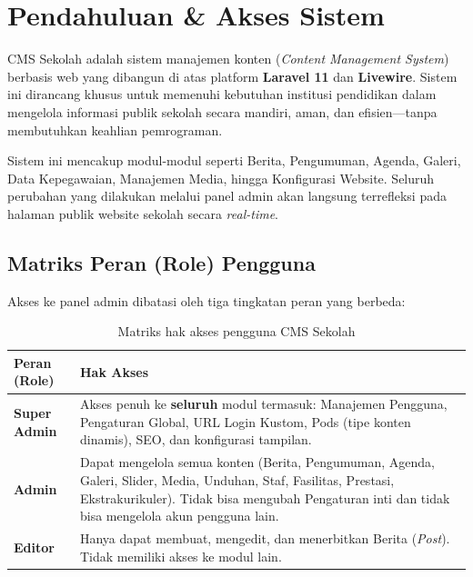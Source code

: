 
\chapter{Pendahuluan \& Akses Sistem}

CMS Sekolah adalah sistem manajemen konten (\textit{Content Management System}) berbasis web
yang dibangun di atas platform \textbf{Laravel 11} dan \textbf{Livewire}. Sistem ini dirancang
khusus untuk memenuhi kebutuhan institusi pendidikan dalam mengelola informasi publik sekolah
secara mandiri, aman, dan efisien---tanpa membutuhkan keahlian pemrograman.

Sistem ini mencakup modul-modul seperti Berita, Pengumuman, Agenda, Galeri, Data Kepegawaian,
Manajemen Media, hingga Konfigurasi Website. Seluruh perubahan yang dilakukan melalui panel
admin akan langsung terrefleksi pada halaman publik website sekolah secara \textit{real-time}.

\section{Matriks Peran (Role) Pengguna}

Akses ke panel admin dibatasi oleh tiga tingkatan peran yang berbeda:

\begin{table}[H]
\centering
\begin{tabularx}{\textwidth}{|l|X|}
\toprule
\textbf{Peran (Role)} & \textbf{Hak Akses} \\
\midrule
\textbf{Super Admin} &
  Akses penuh ke \textbf{seluruh} modul termasuk: Manajemen Pengguna,
  Pengaturan Global, URL Login Kustom, Pods (tipe konten dinamis),
  SEO, dan konfigurasi tampilan. \\
\midrule
\textbf{Admin} &
  Dapat mengelola semua konten (Berita, Pengumuman, Agenda, Galeri,
  Slider, Media, Unduhan, Staf, Fasilitas, Prestasi, Ekstrakurikuler).
  Tidak bisa mengubah Pengaturan inti dan tidak bisa mengelola akun pengguna lain. \\
\midrule
\textbf{Editor} &
  Hanya dapat membuat, mengedit, dan menerbitkan Berita (\textit{Post}).
  Tidak memiliki akses ke modul lain. \\
\bottomrule
\end{tabularx}
\caption{Matriks hak akses pengguna CMS Sekolah}
\label{table:roles}
\end{table}

